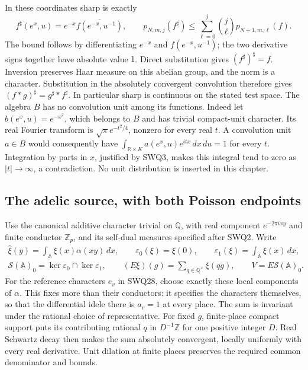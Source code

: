 In these coordinates sharp is exactly
\begin{equation}\tag{SWQ5}
 f^{\sharp}(e^x,u)=e^{-x}\overline{f(e^{-x},u^{-1})},\qquad
 p_{N,m,j}(f^{\sharp})\le
 \sum_{\ell=0}^j\binom j\ell p_{N+1,m,\ell}(f).
\end{equation}
The bound follows by differentiating $e^{-x}$ and $f(e^{-x},u^{-1})$;
the two derivative signs together have absolute value $1$.
Direct substitution gives $(f^{\sharp})^{\sharp}=f$.
Inversion preserves Haar measure on this abelian group, and the norm
is a character. Substitution in the absolutely convergent convolution
therefore gives $(f*g)^{\sharp}=g^{\sharp}*f^{\sharp}$.
In particular sharp is continuous on the stated test space.
The algebra $B$ has no convolution unit among its functions.
Indeed let $b(e^x,u)=e^{-x^2}$, which belongs to $B$ and has
trivial compact-unit character. Its real Fourier transform is
$\sqrt\pi e^{-t^2/4}$, nonzero for every real $t$. A convolution
unit $a\in B$ would consequently have
$\int_{\mathbb R\times K}a(e^x,u)e^{itx}\,dx\,du=1$ for every
$t$. Integration by parts in $x$, justified by SWQ3, makes this
integral tend to zero as $|t|\to\infty$, a contradiction.
No unit distribution is inserted in this chapter.

\subsection{The adelic source, with both Poisson endpoints}

Use the canonical additive character trivial on $\mathbb Q$, with
real component $e^{-2\pi ixy}$ and finite conductor $\mathbb Z_p$,
and its self-dual measures specified after SWQ2. Write
\begin{equation}\tag{SWQ6}
\begin{gathered}
 \widehat\xi(y)=\int_{\mathbb A}\xi(x)\alpha(xy)\,dx,
 \qquad \varepsilon_0(\xi)=\xi(0),\qquad
 \varepsilon_1(\xi)=\int_{\mathbb A}\xi(x)\,dx,\\
 \mathcal S(\mathbb A)_0=\ker\varepsilon_0\cap\ker\varepsilon_1,
 \qquad (E\xi)(g)=\sum_{q\in\mathbb Q^{\times}}\xi(qg),
 \qquad V=E\mathcal S(\mathbb A)_0.
\end{gathered}
\end{equation}
For the reference characters $e_v$ in SWQ28, choose exactly
these local components of $\alpha$. This fixes more than their
conductors: it specifies the characters themselves, so that
the differential idele there is $a_v=1$ at every place.
The sum is invariant under the rational choice of representative.
For fixed $g$, finite-place compact support puts its contributing
rational $q$ in $D^{-1}\mathbb Z$ for one positive integer $D$.
Real Schwartz decay then makes the sum absolutely convergent,
locally uniformly with every real derivative. Unit dilation at
finite places preserves the required common denominator and bounds.

